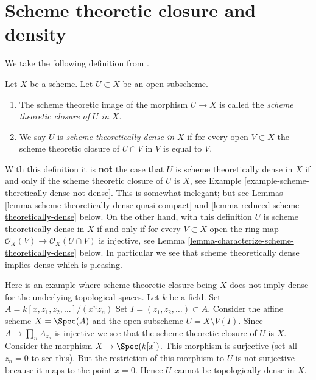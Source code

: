 \section{Scheme theoretic closure and density}
\label{section-scheme-theoretic-closure}

\noindent
We take the following definition from \cite[IV, Definition 11.10.2]{EGA}.

\begin{definition}
\label{definition-scheme-theoretically-dense}
Let $X$ be a scheme. Let $U \subset X$ be an open subscheme.
\begin{enumerate}
\item The scheme theoretic image of the morphism $U \to X$
is called the {\it scheme theoretic closure of $U$ in $X$}.
\item We say $U$ is {\it scheme theoretically dense in $X$}
if for every open $V \subset X$ the scheme theoretic closure
of $U \cap V$ in $V$ is equal to $V$.
\end{enumerate}
\end{definition}

\noindent
With this definition it is
{\bf not} the case that $U$ is scheme theoretically dense in $X$ if and
only if the scheme theoretic closure of $U$ is $X$, see
Example \ref{example-scheme-theretically-dense-not-dense}.
This is somewhat inelegant; but see
Lemmas \ref{lemma-scheme-theoretically-dense-quasi-compact} and
\ref{lemma-reduced-scheme-theoretically-dense}
below. On the other hand, with this definition $U$ is scheme theoretically
dense in $X$ if and only if for every $V \subset X$ open the ring map
$\mathcal{O}_X(V) \to \mathcal{O}_X(U \cap V)$ is injective, see
Lemma \ref{lemma-characterize-scheme-theoretically-dense}
below. In particular we see that scheme theoretically dense implies dense
which is pleasing.

\begin{example}
\label{example-scheme-theretically-dense-not-dense}
Here is an example where scheme theoretic closure being $X$ does not
imply dense for the underlying topological spaces.
Let $k$ be a field.
Set $A = k[x, z_1, z_2, \ldots]/(x^n z_n)$
Set $I = (z_1, z_2, \ldots) \subset A$.
Consider the affine scheme $X = \Spec(A)$ and the
open subscheme $U = X \setminus V(I)$.
Since $A \to \prod_n A_{z_n}$ is injective we see that the scheme theoretic
closure of $U$ is $X$. Consider the morphism
$X \to \Spec(k[x])$. This morphism is surjective
(set all $z_n = 0$ to see this). But the restriction
of this morphism to $U$ is not surjective because it maps
to the point $x = 0$. Hence $U$ cannot be topologically dense
in $X$.
\end{example}

